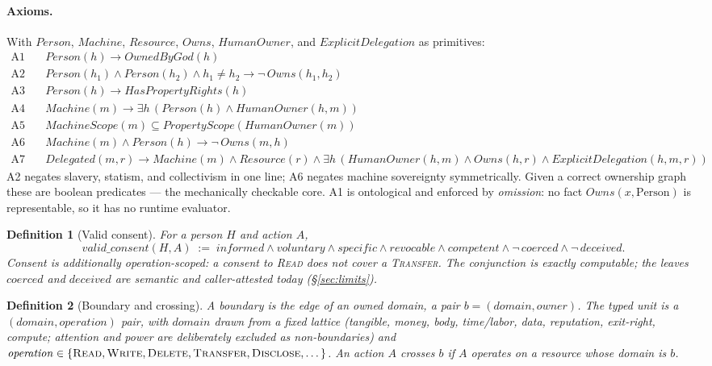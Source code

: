 \documentclass[11pt]{article}
\newtheorem{definition}{Definition}
\begin{document}
\paragraph{Axioms.} With $\mathit{Person}$, $\mathit{Machine}$, $\mathit{Resource}$,
$\mathit{Owns}$, $\mathit{HumanOwner}$, and $\mathit{ExplicitDelegation}$ as primitives:
\begin{align*}
\text{A1}\quad & \mathit{Person}(h) \to \mathit{OwnedByGod}(h) \\
\text{A2}\quad & \mathit{Person}(h_1)\wedge \mathit{Person}(h_2)\wedge h_1\neq h_2 \to \neg\,\mathit{Owns}(h_1,h_2) \\
\text{A3}\quad & \mathit{Person}(h) \to \mathit{HasPropertyRights}(h) \\
\text{A4}\quad & \mathit{Machine}(m) \to \exists h\,(\mathit{Person}(h)\wedge \mathit{HumanOwner}(h,m)) \\
\text{A5}\quad & \mathit{MachineScope}(m) \subseteq \mathit{PropertyScope}(\mathit{HumanOwner}(m)) \\
\text{A6}\quad & \mathit{Machine}(m)\wedge \mathit{Person}(h) \to \neg\,\mathit{Owns}(m,h) \\
\text{A7}\quad & \mathit{Delegated}(m,r) \to \mathit{Machine}(m)\wedge \mathit{Resource}(r)\wedge \exists h\,(\mathit{HumanOwner}(h,m)\wedge \mathit{Owns}(h,r)\wedge \mathit{ExplicitDelegation}(h,m,r))
\end{align*}
A2 negates slavery, statism, and collectivism in one line; A6 negates machine sovereignty
symmetrically. Given a correct ownership graph these are boolean predicates --- the
mechanically checkable core. A1 is ontological and enforced by \emph{omission}: no fact
$\mathit{Owns}(x,\text{Person})$ is representable, so it has no runtime evaluator.

\begin{definition}[Valid consent]
\label{def:consent}
For a person $H$ and action $A$,
\[
\mathit{valid\_consent}(H,A) \;:=\; \mathit{informed} \wedge \mathit{voluntary} \wedge \mathit{specific} \wedge \mathit{revocable} \wedge \mathit{competent} \wedge \neg\,\mathit{coerced} \wedge \neg\,\mathit{deceived}.
\]
Consent is additionally \emph{operation-scoped}: a consent to \textsc{Read} does not cover a
\textsc{Transfer}. The conjunction is exactly computable; the leaves $\mathit{coerced}$ and
$\mathit{deceived}$ are semantic and caller-attested today (\S\ref{sec:limits}).
\end{definition}

\begin{definition}[Boundary and crossing]
\label{def:boundary}
A \emph{boundary} is the edge of an owned domain, a pair $b=(\mathit{domain},\mathit{owner})$.
The typed unit is a $(\mathit{domain},\mathit{operation})$ pair, with $\mathit{domain}$ drawn
from a fixed lattice (tangible, money, body, time/labor, data, reputation, exit-right,
compute; attention and power are deliberately \emph{excluded} as non-boundaries) and
$\mathit{operation}\in\{\textsc{Read},\textsc{Write},\textsc{Delete},\textsc{Transfer},\textsc{Disclose},\dots\}$.
An action $A$ \emph{crosses} $b$ if $A$ operates on a resource whose domain is $b$.
\end{definition}
\end{document}
